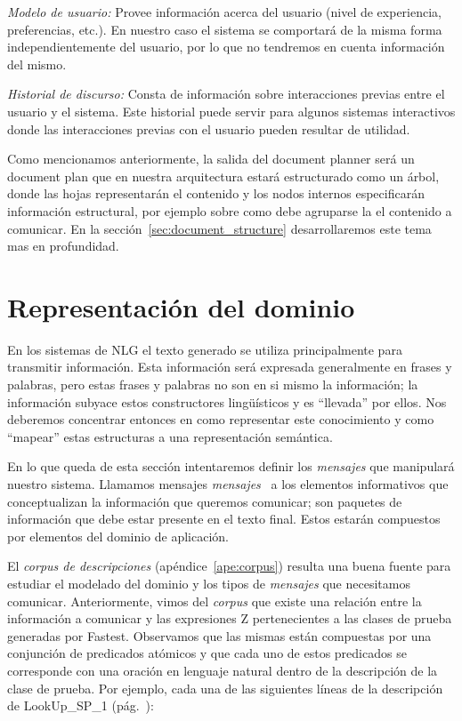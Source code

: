 \bigskip
\noindent
\emph{Modelo de usuario:} Provee información acerca del usuario (nivel de experiencia, preferencias, etc.). En nuestro caso el sistema se comportará de la misma forma independientemente del usuario, por lo que no tendremos en cuenta información del mismo.

\bigskip
\noindent
\emph{Historial de discurso:} Consta de información sobre interacciones previas entre el usuario y el sistema. Este historial puede servir para algunos sistemas interactivos donde las interacciones previas con el usuario pueden resultar de utilidad. 

\bigskip
Como mencionamos anteriormente, la salida del document planner será un document plan que en nuestra arquitectura estará estructurado como un árbol, donde las hojas representarán el contenido y los nodos internos especificarán información estructural, por ejemplo sobre como debe agruparse la el contenido a comunicar. En la sección~\ref{sec:document_structure} desarrollaremos este tema mas en profundidad.

\section{Representación del dominio}

En los sistemas de NLG el texto generado se utiliza principalmente para transmitir información. Esta información será expresada generalmente en frases y palabras, pero estas  frases y palabras no son en si mismo la información; la información subyace estos constructores lingüísticos y es ``llevada'' por ellos. Nos deberemos concentrar entonces en como representar este conocimiento y como ``mapear'' estas estructuras a una representación semántica. 

En lo que queda de esta sección intentaremos definir los \emph{mensajes} que manipulará nuestro sistema. Llamamos mensajes \emph{mensajes}~\cite{reiter_dale} a los elementos informativos que conceptualizan la información que queremos comunicar; son paquetes de información que debe estar presente en el texto final. Estos estarán compuestos por elementos del dominio de aplicación.


El \emph{corpus de descripciones} (apéndice~\ref{ape:corpus}) resulta una buena fuente para estudiar el modelado del dominio y los tipos de \emph{mensajes} que necesitamos comunicar. Anteriormente, vimos del \emph{corpus} que existe una relación entre la información a comunicar y las expresiones Z pertenecientes a las clases de prueba generadas por Fastest. Observamos que las mismas están compuestas por una conjunción de predicados atómicos y que cada uno de estos predicados se corresponde con una oración en lenguaje natural dentro de la descripción de la clase de prueba. Por ejemplo, cada una de las siguientes líneas de la descripción de LookUp\_SP\_1 (pág.~\pageref{fig:ej_desc_lookup_sp_1}):

